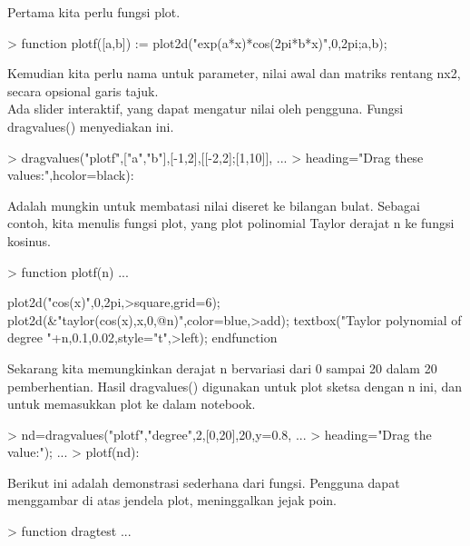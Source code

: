 \documentclass{report}
\begin{document}
\begin{eulernotebook}
\begin{eulercomment}
\begin{eulercomment}
\begin{eulercomment}
\begin{eulercomment}
\begin{eulercomment}
Pertama kita perlu fungsi plot.
\end{eulercomment}
\begin{eulerprompt}
> function plotf([a,b]) := plot2d("exp(a*x)*cos(2pi*b*x)",0,2pi;a,b);
\end{eulerprompt}
\begin{eulercomment}
Kemudian kita perlu nama untuk parameter, nilai awal dan matriks
rentang nx2, secara opsional garis tajuk.\\
Ada slider interaktif, yang dapat mengatur nilai oleh pengguna. Fungsi
dragvalues() menyediakan ini.
\end{eulercomment}
\begin{eulerprompt}
> dragvalues("plotf",["a","b"],[-1,2],[[-2,2];[1,10]], ...
>  heading="Drag these values:",hcolor=black):
\end{eulerprompt}
\begin{eulercomment}
Adalah mungkin untuk membatasi nilai diseret ke bilangan bulat.
Sebagai contoh, kita menulis fungsi plot, yang plot polinomial Taylor
derajat n ke fungsi kosinus.
\end{eulercomment}
\begin{eulerprompt}
> function plotf(n) ...
\end{eulerprompt}
\begin{eulerudf}
  plot2d("cos(x)",0,2pi,>square,grid=6);
  plot2d(&"taylor(cos(x),x,0,@n)",color=blue,>add);
  textbox("Taylor polynomial of degree "+n,0.1,0.02,style="t",>left);
  endfunction
\end{eulerudf}
\begin{eulercomment}
Sekarang kita memungkinkan derajat n bervariasi dari 0 sampai 20 dalam
20 pemberhentian. Hasil dragvalues() digunakan untuk plot sketsa
dengan n ini, dan untuk memasukkan plot ke dalam notebook.
\end{eulercomment}
\begin{eulerprompt}
> nd=dragvalues("plotf","degree",2,[0,20],20,y=0.8, ...
>    heading="Drag the value:"); ...
> plotf(nd):
\end{eulerprompt}
\begin{eulercomment}
Berikut ini adalah demonstrasi sederhana dari fungsi. Pengguna dapat
menggambar di atas jendela plot, meninggalkan jejak poin.
\end{eulercomment}
\begin{eulerprompt}
> function dragtest ...
\end{eulerprompt}
\begin{eulerudf}

\end{eulerudf}
\end{eulercomment}
\end{eulercomment}
\end{eulercomment}
\end{eulercomment}
\end{eulernotebook}
\end{document}
